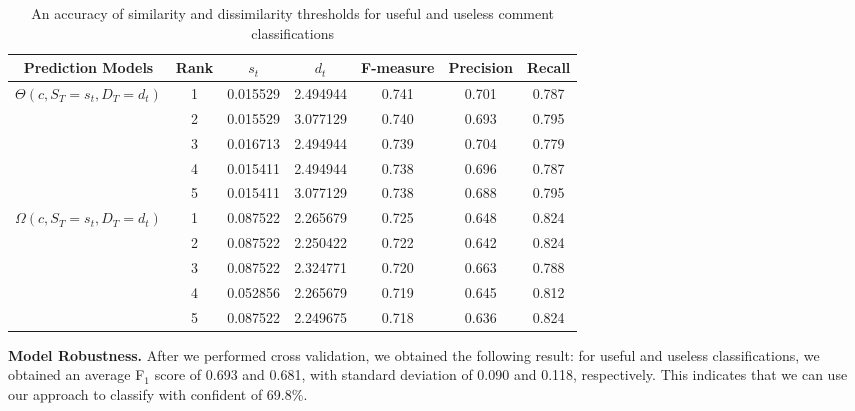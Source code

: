 \begin{table*}[!t]
\caption{An accuracy of similarity and dissimilarity thresholds for useful and useless comment classifications}
\small
\centering
\def\arraystretch{1.2}
\begin{tabular}{ccccccc}
\hline
Prediction Models  & Rank & $s_t$ & $d_t$ & F-measure & Precision & Recall \\ \hline \hline
\multirow{5}{*}{$\Theta(c,S_T=s_t,D_T=d_t)$}
& 1 & 0.015529 & 2.494944 & 0.741 & 0.701 & 0.787 \\ \cline{2-7}
& 2 & 0.015529 & 3.077129 & 0.740 & 0.693 & 0.795 \\ \cline{2-7}
& 3 & 0.016713 & 2.494944 & 0.739 & 0.704 & 0.779 \\ \cline{2-7}
& 4 & 0.015411 & 2.494944 & 0.738 & 0.696 & 0.787 \\ \cline{2-7}
& 5 & 0.015411 & 3.077129 & 0.738 & 0.688 & 0.795
\\ \hline \hline
\multirow{5}{*}{$\Omega(c,S_T=s_t,D_T=d_t)$}
& 1 & 0.087522 & 2.265679 & 0.725 & 0.648 & 0.824 \\ \cline{2-7}
& 2 & 0.087522 & 2.250422 & 0.722 & 0.642 & 0.824 \\ \cline{2-7}
& 3 & 0.087522 & 2.324771 & 0.720 & 0.663 & 0.788 \\ \cline{2-7}
& 4 & 0.052856 & 2.265679 & 0.719 & 0.645 & 0.812 \\ \cline{2-7}
& 5 & 0.087522 & 2.249675 & 0.718 & 0.636 & 0.824
\\ \hline
\end{tabular}
\label{tb:thresholds}
\end{table*}

\textbf{Model Robustness.} After we performed cross validation, we obtained the following result:
for useful and useless classifications,
we obtained an average F$_1$ score of 0.693 and 0.681,
with standard deviation of 0.090 and 0.118, respectively.
This indicates that we can use our approach to classify with confident of 69.8\%.
 

